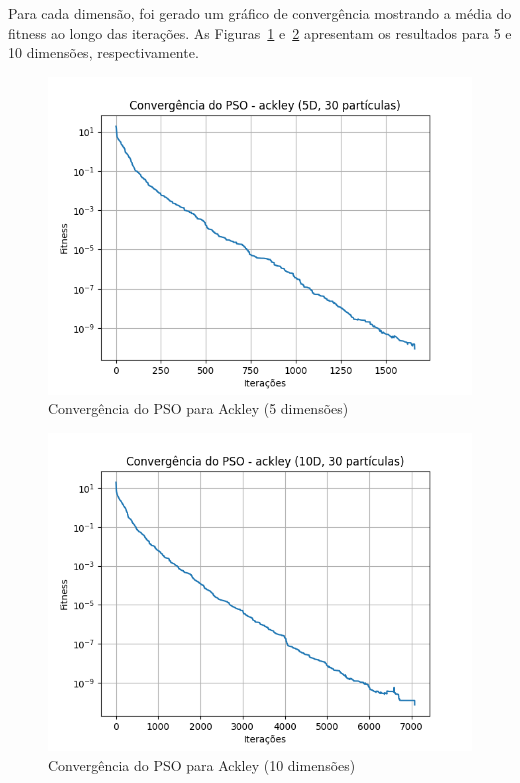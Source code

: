 \documentclass[12pt]{article}
\begin{document}
Para cada dimensão, foi gerado um gráfico de convergência mostrando a média do fitness ao longo das iterações. As Figuras~\ref{fig:convergencia5d} e~\ref{fig:convergencia10d} apresentam os resultados para 5 e 10 dimensões, respectivamente.

\begin{figure}[H]
  \centering
  \includegraphics[width=.9\textwidth]{convergencia_ackley_5D.png}
  \caption{Convergência do PSO para Ackley (5 dimensões)}
  \label{fig:convergencia5d}
\end{figure}

\begin{figure}[H]
  \centering
  \includegraphics[width=.9\textwidth]{../graphs/convergencia_ackley_10D.png}
  \caption{Convergência do PSO para Ackley (10 dimensões)}
  \label{fig:convergencia10d}
\end{figure}
\end{document}
